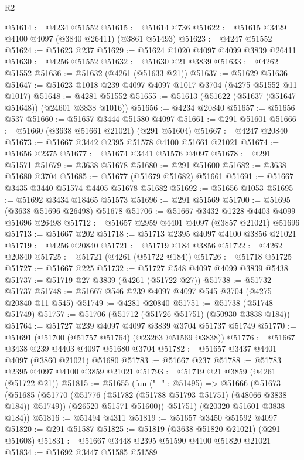 \begin{lexlean}{R2}
\begin{coremodule}
@51614 := @4234 @51552
@51615 := @51614 @736
@51622 := @51615 @3429 @4100 @4097 (@3840 @26411) (@3861 @51493)
@51623 := @4247 @51552
@51624 := @51623 @237
@51629 := @51624 @1020 @4097 @4099 @3839 @26411
@51630 := @4256 @51552
@51632 := @51630 @21 @3839
@51633 := @4262 @51552
@51636 := @51632 (@4261 (@51633 @21))
@51637 := @51629 @51636
@51647 := @51623 @1018 @239 @4097 @4097 @1017 @3704 (@4275 @51552 @11 @1017)
@51648 := @4281 @51552
@51655 := @51613 (@51622 (@51637 (@51647 @51648)) (@24601 @3838 @1016))
@51656 := @4234 @20840
@51657 := @51656 @537
@51660 := @51657 @3444 @51580 @4097
@51661 := @291 @51601
@51666 := @51660 (@3638 @51661 @21021) (@291 @51604)
@51667 := @4247 @20840
@51673 := @51667 @3442 @2395 @51578 @4100 @51661 @21021
@51674 := @51656 @2375
@51677 := @51674 @3441 @51576 @4097
@51678 := @291 @51571
@51679 := @3638 @51678
@51680 := @291 @51600
@51682 := @3638 @51680 @3704
@51685 := @51677 (@51679 @51682) @51661
@51691 := @51667 @3435 @3440 @51574 @4405 @51678 @51682
@51692 := @51656 @1053
@51695 := @51692 @3434 @18465 @51573
@51696 := @291 @51569
@51700 := @51695 (@3638 @51696 @26498) @51678
@51706 := @51667 @3432 @1228 @4403 @4099 @51696 @26498
@51712 := @51657 @2959 @4401 @4097 (@3857 @21021) @51696
@51713 := @51667 @202
@51718 := @51713 @2395 @4097 @4100 @3856 @21021
@51719 := @4256 @20840
@51721 := @51719 @184 @3856
@51722 := @4262 @20840
@51725 := @51721 (@4261 (@51722 @184))
@51726 := @51718 @51725
@51727 := @51667 @225
@51732 := @51727 @548 @4097 @4099 @3839 @5438
@51737 := @51719 @27 @3839 (@4261 (@51722 @27))
@51738 := @51732 @51737
@51748 := @51667 @546 @239 @4097 @4097 @545 @3704 (@4275 @20840 @11 @545)
@51749 := @4281 @20840
@51751 := @51738 (@51748 @51749)
@51757 := @51706 (@51712 (@51726 @51751) (@50930 @3838 @184))
@51764 := @51727 @239 @4097 @4097 @3839 @3704 @51737 @51749
@51770 := @51691 (@51700 (@51757 @51764) (@23263 @51569 @3838))
@51776 := @51667 @3438 @239 @4403 @4097 @51680 @3704
@51782 := @51657 @3437 @4401 @4097 (@3860 @21021) @51680
@51783 := @51667 @237
@51788 := @51783 @2395 @4097 @4100 @3859 @21021
@51793 := @51719 @21 @3859 (@4261 (@51722 @21))
@51815 := @51655
    (fun ("_" : @51495) =>
    @51666
      (@51673
        (@51685
          (@51770 (@51776 (@51782 (@51788 @51793 @51751) (@48066 @3838 @184)) @51749))
          (@26520 @51571 @51600))
        @51751)
      (@20320 @51601 @3838 @184))
@51816 := @51494 @4311
@51819 := @51657 @3450 @51592 @4097
@51820 := @291 @51587
@51825 := @51819 (@3638 @51820 @21021) (@291 @51608)
@51831 := @51667 @3448 @2395 @51590 @4100 @51820 @21021
@51834 := @51692 @3447 @51585 @51589

\end{coremodule}
\end{lexlean}
